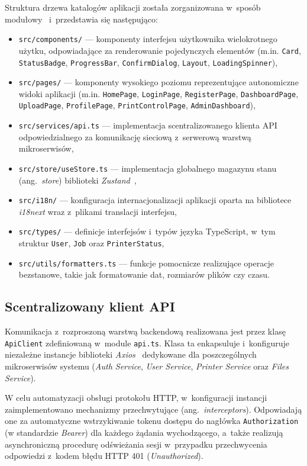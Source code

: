 \documentclass[a4paper,12pt,reqno]{article}
\begin{document}
Struktura drzewa katalogów aplikacji została zorganizowana w~sposób modułowy~\cite{martin2022} i~przedstawia się następująco:
\begin{itemize}
	\item \texttt{src/components/} --- komponenty interfejsu użytkownika wielokrotnego użytku, odpowiadające za renderowanie pojedynczych elementów (m.in. \texttt{Card}, \texttt{StatusBadge}, \texttt{ProgressBar}, \texttt{ConfirmDialog}, \texttt{Layout}, \texttt{LoadingSpinner}),
	\item \texttt{src/pages/} --- komponenty wysokiego poziomu reprezentujące autonomiczne widoki aplikacji (m.in. \texttt{HomePage}, \texttt{LoginPage}, \texttt{RegisterPage}, \texttt{DashboardPage}, \texttt{UploadPage}, \texttt{ProfilePage}, \texttt{PrintControlPage}, \texttt{AdminDashboard}),
	\item \texttt{src/services/api.ts} --- implementacja scentralizowanego klienta API odpowiedzialnego za komunikację sieciową z~serwerową warstwą mikroserwisów,
	\item \texttt{src/store/useStore.ts} --- implementacja globalnego magazynu stanu (ang.~\textit{store}) biblioteki \textit{Zustand}~\cite{zustand},
	\item \texttt{src/i18n/} --- konfiguracja internacjonalizacji aplikacji oparta na bibliotece \textit{i18next} wraz z~plikami translacji interfejsu,
	\item \texttt{src/types/} --- definicje interfejsów i~typów języka TypeScript, w~tym struktur \texttt{User}, \texttt{Job} oraz \texttt{PrinterStatus},
	\item \texttt{src/utils/formatters.ts} --- funkcje pomocnicze realizujące operacje bezstanowe, takie jak formatowanie dat, rozmiarów plików czy czasu.
\end{itemize}

\subsection{Scentralizowany klient API}

Komunikacja z~rozproszoną warstwą backendową realizowana jest przez klasę \texttt{ApiClient} zdefiniowaną w~module \texttt{api.ts}. Klasa ta enkapsuluje i~konfiguruje niezależne instancje biblioteki \textit{Axios}~\cite{axios} dedykowane dla poszczególnych mikroserwisów systemu (\textit{Auth Service}, \textit{User Service}, \textit{Printer Service} oraz \textit{Files Service}).

W celu automatyzacji obsługi protokołu HTTP, w~konfiguracji instancji zaimplementowano mechanizmy przechwytujące (ang.~\textit{interceptors}). Odpowiadają one za automatyczne wstrzykiwanie tokenu dostępu do nagłówka \texttt{Authorization} (w standardzie \textit{Bearer}) dla każdego żądania wychodzącego, a~także realizują asynchroniczną procedurę odświeżania sesji w~przypadku przechwycenia odpowiedzi z~kodem błędu HTTP 401 (\textit{Unauthorized}).
\end{document}
